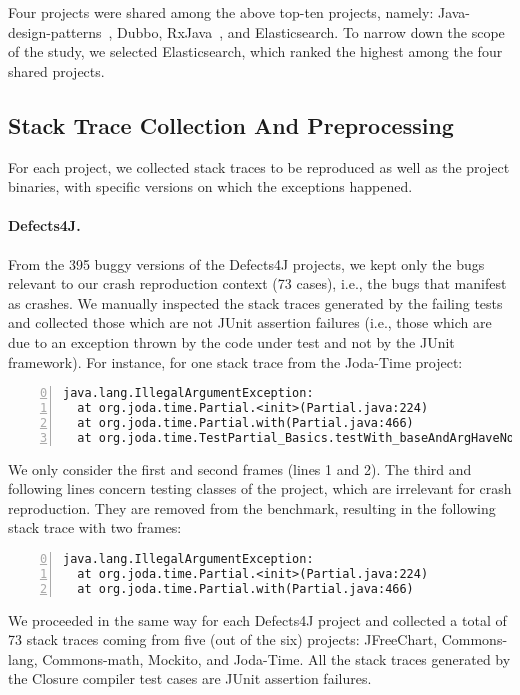 Four projects were shared among the above top-ten projects, namely: Java-design-patterns~\cite{jdp}, Dubbo\cite{dubbo}, RxJava~\cite{rxjava}, and Elasticsearch.
To narrow down the scope of the study, we selected Elasticsearch, which ranked the highest among the four shared projects.


\subsection{Stack Trace Collection And Preprocessing}

For each project, we collected stack traces to be reproduced as well as the project binaries, with specific versions on which the exceptions happened.

\paragraph{Defects4J.}
%
From the 395 buggy versions of the Defects4J projects, we kept only the bugs relevant to our crash reproduction context (73 cases), i.e., the bugs that manifest as crashes. We manually inspected the stack traces generated by the failing tests and collected those which are not JUnit assertion failures (i.e., those which are due to an exception thrown by the code under test and not by the JUnit framework).
For instance, for one stack trace from the Joda-Time project:
%
\begin{lstlisting}[basicstyle=\scriptsize\ttfamily,breaklines=true,numbers=left,firstnumber=0]
java.lang.IllegalArgumentException:
  at org.joda.time.Partial.<init>(Partial.java:224)
  at org.joda.time.Partial.with(Partial.java:466)
  at org.joda.time.TestPartial_Basics.testWith_baseAndArgHaveNoRange(...)
\end{lstlisting}
%
We only consider the first and second frames (lines 1 and 2).
The third and following lines concern testing classes of the project, which are irrelevant for crash reproduction.
They are removed from the benchmark, resulting in the following stack trace with two frames:
%
\begin{lstlisting}[basicstyle=\scriptsize\ttfamily,breaklines=true,numbers=left,firstnumber=0]
java.lang.IllegalArgumentException:
  at org.joda.time.Partial.<init>(Partial.java:224)
  at org.joda.time.Partial.with(Partial.java:466)
\end{lstlisting}
%
We proceeded in the same way for each Defects4J project and collected a total of 73 stack traces coming from five (out of the six) projects: JFreeChart, Commons-lang, Commons-math, Mockito, and Joda-Time. All the stack traces generated by the Closure compiler test cases are JUnit assertion failures.

